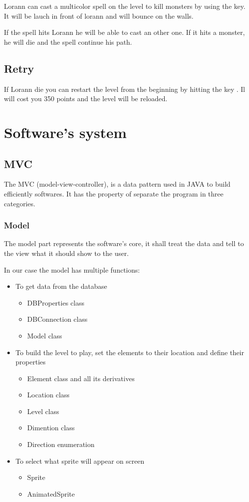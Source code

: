 \documentclass{report}
\begin{document}
Lorann can cast a multicolor spell on the level to kill monsters by using the  key. It will be lauch in front of lorann and will bounce on the walls.

If the spell hits Lorann he will be able to cast an other one. If it hits a monster, he will die and the spell continue his path.

\section{Retry}

If Lorann die you can restart the level from the beginning by hitting the key . Il will cost you 350 points and the level will be reloaded.

\chapter{Software's system}

\section{MVC}

The MVC (model-view-controller), is a data pattern used in JAVA to build efficiently softwares. It has the property of separate the program in three categories.

\subsection{Model}

The model part represents the software’s core, it shall treat the data and tell to the view what it should show to the user. 

In our case the model has multiple functions:

\begin{itemize}
\item To get data from the database
	\begin{itemize}
	\item DBProperties class
	\item DBConnection class
	\item Model class
	\end{itemize}
\item To build the level to play, set the elements to their location and define their properties
	\begin{itemize}
	\item Element class and all its derivatives
	\item Location class
	\item Level class
	\item Dimention class
	\item Direction enumeration
	\end{itemize}
\item To select what sprite will appear on screen
	\begin{itemize}
	\item Sprite
	\item AnimatedSprite
	\end{itemize}
\end{itemize}
\end{document}
